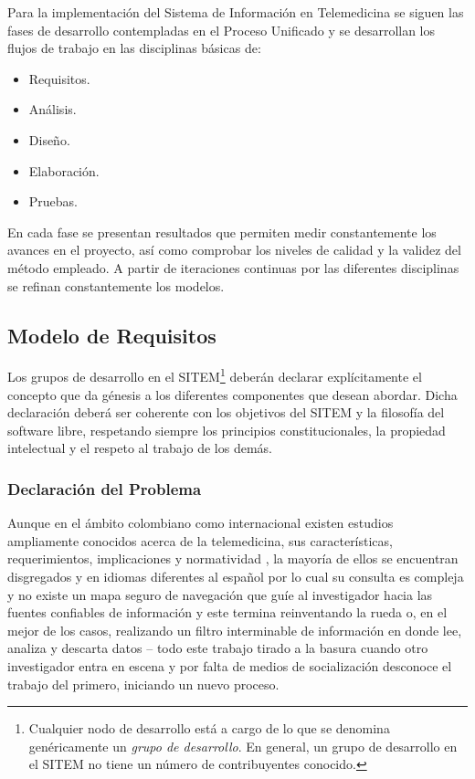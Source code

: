 Para la implementación del Sistema de Información en Telemedicina se siguen las fases de desarrollo contempladas en el Proceso Unificado y se desarrollan los flujos de trabajo en las disciplinas básicas de:
\begin{itemize}
 \item Requisitos.
\item Análisis.
\item Diseño.
\item Elaboración.
\item Pruebas.
\end{itemize}

En cada fase se presentan resultados que permiten medir constantemente los avances en el proyecto, así como comprobar los niveles de calidad y la validez del método empleado. A partir de iteraciones continuas por las diferentes disciplinas se refinan constantemente los modelos.

\subsection{Modelo de Requisitos}

Los grupos de desarrollo en el SITEM\footnote{Cualquier nodo de desarrollo está a cargo de lo que se denomina genéricamente un \textit{grupo de desarrollo}. En general, un grupo de desarrollo en el SITEM no tiene un número de contribuyentes conocido.} deberán declarar explícitamente el concepto que da génesis a los diferentes componentes que desean abordar. Dicha declaración deberá ser coherente con los objetivos del SITEM y la filosofía del software libre, respetando siempre los principios constitucionales, la propiedad intelectual y el respeto al trabajo de los demás.

\subsubsection{Declaración del Problema}
Aunque en el ámbito colombiano como internacional existen estudios ampliamente conocidos acerca de la telemedicina, sus características, requerimientos, implicaciones y normatividad \cite{aparicio2003} \cite{bashshur77} \cite{bashshur95} \cite{oas2002}, la mayoría de ellos se encuentran disgregados y en idiomas diferentes al español por lo cual su consulta es compleja y no existe un mapa seguro de navegación que guíe al investigador hacia las fuentes confiables de información y este termina reinventando la rueda o, en el mejor de los casos, realizando un filtro interminable de información en donde lee, analiza y descarta datos – todo este trabajo tirado a la basura cuando otro investigador entra en escena y por falta de medios de socialización desconoce el trabajo del primero, iniciando un nuevo proceso.

